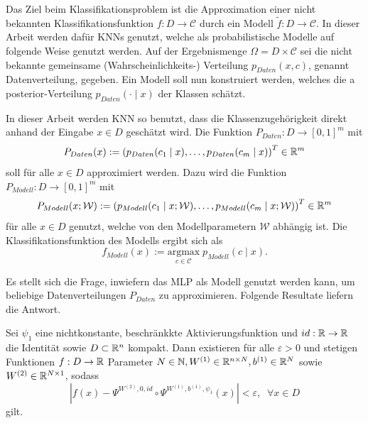 Das Ziel beim Klassifikationsproblem ist die Approximation einer nicht bekannten Klassifikationsfunktion $f:D \rightarrow \mathcal{C}$ durch ein Modell $\tilde{f}: D \rightarrow \mathcal{C}$. 
In dieser Arbeit werden dafür KNNs genutzt, welche als probabilistische Modelle auf folgende Weise genutzt werden. Auf der Ergebnismenge $\Omega= D \times \mathcal{C}$ sei die nicht bekannte gemeinsame (Wahrscheinlichkeits-) Verteilung $p_{Daten}(x,c)$, genannt Datenverteilung, gegeben. Ein Modell soll nun konstruiert werden, welches die a posterior-Verteilung $p_{Daten}(\cdot \; | \; x)$ der Klassen schätzt. 

In dieser Arbeit werden KNN so benutzt, dass die Klassenzugehörigkeit direkt anhand der Eingabe $x \in D$ geschätzt wird. Die Funktion $P_{Daten}: D \rightarrow [0,1]^m$ mit
\begin{equation}
    \label{eq:Pdaten}
    P_{Daten}(x):=\left(p_{Daten}(c_1 \; | \; x), \ldots, p_{Daten}(c_m \; | \; x)\right)^T \in \mathbb{R}^m
\end{equation} soll für alle $x \in D$ approximiert werden. Dazu wird die Funktion $P_{Modell}: D \rightarrow [0,1]^m$ mit 
\begin{equation}
    \label{eq:Pmodell}
    P_{Modell}(x;\mathcal{W}):=\left(p_{Modell}(c_1 \; | \; x; \mathcal{W}), \ldots, p_{Modell}(c_m \; | \; x; \mathcal{W})\right)^T \in \mathbb{R}^m
\end{equation}
 für alle $x \in D$  genutzt, welche von den Modellparametern $\mathcal{W}$ abhängig ist. Die Klassifikationsfunktion des Modells ergibt sich als
\begin{equation}
    \label{eq:f_modell}
    f_{Modell}(x):= \underset{c \in \mathcal{C}}{\mathrm{argmax}} \; p_{Modell}(c \; | \; x).
\end{equation}

Es stellt sich die Frage, inwiefern das MLP als Modell genutzt werden kann, um beliebige Datenverteilungen $P_{Daten}$ zu approximieren. Folgende Resultate liefern die Antwort.

\begin{satz}
    \label{UAT}
    Sei $\psi_1$ eine nichtkonstante, beschränkkte Aktivierungsfunktion und $id: \mathbb{R} \rightarrow \mathbb{R}$ die Identität sowie $D \subset \mathbb{R}^n$ kompakt. Dann existieren für alle $\varepsilon >0$ und stetigen Funktionen $f: D \rightarrow \mathbb{R}$ Parameter $N \in \mathbb{N}, W^{(1)} \in \mathbb{R}^{n \times N}, b^{(1)} \in \mathbb{R}^N$ sowie $W^{(2)} \in \mathbb{R}^{N \times 1}$, sodass
    \begin{equation}
        \label{UAP_eq}
        \left|f(x)-\Psi^{W^{(2)},0,id} \circ \Psi^{W^{(1)},b^{(1)},\psi_1}(x)\right| < \varepsilon, \; \; \forall x \in D
    \end{equation}
    gilt.
\end{satz}

